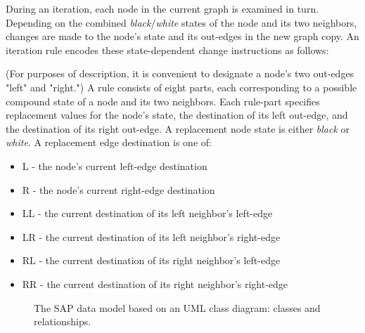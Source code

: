 \documentclass[twoside,twocolumn]{article}
\begin{document}
During an iteration, each node in the current graph is examined in turn.
Depending on the combined \textit{black}/\textit{white}
states of the node and its two neighbors, changes are made to the node's
state and its out-edges in the new graph copy. An iteration rule encodes these state-dependent change
instructions as follows:

(For purposes of description, it is convenient to designate a node's two out-edges "left" and "right.")
A rule consists of eight parts, each corresponding to a possible compound state of a node and its
two neighbors. Each rule-part specifies replacement values for
the node's state, the destination of its left out-edge, and the destination of its right
out-edge. A replacement node state is either \textit{black} or \textit{white}.
A replacement edge destination is one of:

\begin{itemize}
    \item L - the node's current left-edge destination
    \item R - the node's current right-edge destination
    \item LL - the current destination of its left neighbor's left-edge
    \item LR - the current destination of its left neighbor's right-edge
    \item RL - the current destination of its right neighbor's left-edge
    \item RR - the current destination of its right neighbor's right-edge
\end{itemize}

\begin{figure}[tb] 
\centering
\caption{The SAP data model based on an UML class diagram: classes and relationships.}
\label{fig:Fig5}
\end{figure}
\end{document}
